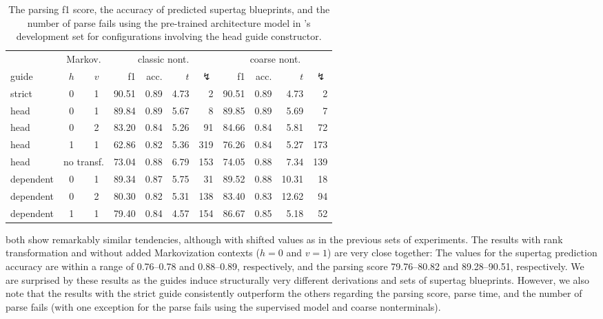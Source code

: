 \documentclass[../../document.tex]{subfiles}
\begin{document}
    \begin{table}
        \caption{\label{tbl:gridsearch:head:3}
        The parsing f1 score, the accuracy of predicted supertag blueprints, and the number of parse fails using the pre-trained architecture model in \negra{}'s development set for configurations involving the head guide constructor.
        }
        \centering
        \vspace{.2cm}
        \begin{tabular}{lcc|rrrr|rrrr}
            \toprule
                    & \multicolumn{2}{c|}{Markov.} & \multicolumn{4}{c|}{classic nont.} &  \multicolumn{4}{c}{coarse nont.} \\
                    guide           & \(h\) & \(v\) & f1 & acc. & $t$ & $\lightning$ & f1 & acc. & $t$ & $\lightning$  \\ \hline \rowcolor{black!10}
strict & 0 & 1                         & 90.51 & 0.89 & 4.73 &   2 & 90.51 & 0.89 &  4.73 &   2 \\\hline
head & 0 & 1                           & 89.84 & 0.89 & 5.67 &   8 & 89.85 & 0.89 &  5.69 &   7 \\
head & 0 & 2                           & 83.20 & 0.84 & 5.26 &  91 & 84.66 & 0.84 &  5.81 &  72 \\
head & 1 & 1                           & 62.86 & 0.82 & 5.36 & 319 & 76.26 & 0.84 &  5.27 & 173 \\
head & \multicolumn{2}{c|}{no transf.} & 73.04 & 0.88 & 6.79 & 153 & 74.05 & 0.88 &  7.34 & 139 \\\hline
dependent & 0 & 1                      & 89.34 & 0.87 & 5.75 &  31 & 89.52 & 0.88 & 10.31 &  18 \\
dependent & 0 & 2                      & 80.30 & 0.82 & 5.31 & 138 & 83.40 & 0.83 & 12.62 &  94 \\
dependent & 1 & 1                      & 79.40 & 0.84 & 4.57 & 154 & 86.67 & 0.85 &  5.18 &  52 \\
\hline
\bottomrule
        \end{tabular}
    \end{table}

     both show remarkably similar tendencies, although with shifted values as in the previous sets of experiments.
    The results with rank transformation and without added Markovization contexts ($h=0$ and $v=1$) are very close together:
        The values for the supertag prediction accuracy are within a range of 0.76--0.78 and 0.88--0.89, respectively, and the parsing score 79.76--80.82 and 89.28--90.51, respectively.
    We are surprised by these results as the guides induce structurally very different derivations and sets of supertag blueprints.
    However, we also note that the results with the strict guide consistently outperform the others regarding the parsing score, parse time, and the number of parse fails (with one exception for the parse fails using the supervised model and coarse nonterminals).
\end{document}
